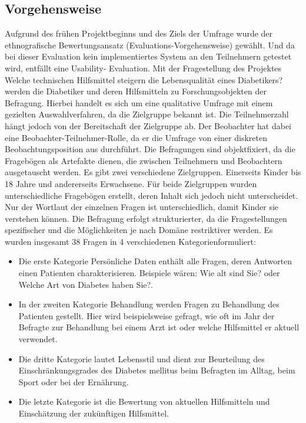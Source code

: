 \documentclass[a4paper,11pt]{article}%
\renewcommand{\\}{\vspace*{0.5\baselineskip} \newline}
\begin{document}
	\subsection{Vorgehensweise}
	Aufgrund des frühen Projektbeginns und des Ziels der Umfrage wurde der ethnografische Bewertungsansatz (Evaluations-Vorgehensweise) gewählt. Und da bei dieser Evaluation kein implementiertes System an den Teilnehmern getestet wird, entfällt eine Usability- Evaluation. Mit der Fragestellung des Projektes \glqq Welche technischen Hilfsmittel steigern die Lebensqualität eines Diabetikers?\grqq{} werden die Diabetiker und deren Hilfsmitteln zu Forschungsobjekten der Befragung. Hierbei handelt es sich um eine qualitative Umfrage mit einem gezielten Auswahlverfahren, da die Zielgruppe bekannt ist. Die Teilnehmerzahl hängt jedoch von der Bereitschaft der Zielgruppe ab. Der Beobachter hat dabei eine Beobachter-Teilnehmer-Rolle, da er die Umfrage von einer diskreten Beobachtungsposition aus durchführt. Die Befragungen sind objektfixiert, da die Fragebögen als Artefakte dienen, die zwischen Teilnehmern und Beobachtern ausgetauscht werden.\newline
	 Es gibt zwei verschiedene Zielgruppen. Einerseits Kinder bis 18 Jahre und andererseits Erwachsene. Für beide Zielgruppen wurden unterschiedliche Fragebögen erstellt, deren Inhalt sich jedoch nicht unterscheidet. Nur der Wortlaut der einzelnen Fragen ist unterschiedlich, damit Kinder sie verstehen können.\newline
	Die Befragung erfolgt strukturierter, da die Fragestellungen spezifischer und die Möglichkeiten je nach Domäne restriktiver werden. Es wurden insgesamt 38 Fragen in 4 verschiedenen Kategorienformuliert:\newline
	\begin{itemize}
		\item Die erste Kategorie \glqq Persönliche Daten\grqq{} enthält alle Fragen, deren Antworten einen Patienten charakterisieren. Beispiele wären: \glqq Wie alt sind Sie?\grqq{} oder \glqq Welche Art von Diabetes haben Sie?\grqq{}. 
		\item In der zweiten Kategorie \glqq Behandlung\grqq{} werden Fragen zu Behandlung des Patienten gestellt. Hier wird beispielsweise gefragt, wie oft im Jahr der Befragte zur Behandlung bei einem Arzt ist oder welche Hilfsmittel er aktuell verwendet. 
		\item Die dritte Kategorie lautet \glqq Lebensstil\grqq{} und dient zur Beurteilung des Einschränkungsgrades des Diabetes mellitus beim Befragten im Alltag, beim Sport oder bei der Ernährung. 
		\item Die letzte Kategorie ist die \glqq Bewertung\grqq{} von aktuellen Hilfsmitteln und Einschätzung der zukünftigen Hilfsmittel.
	\end{itemize}
\end{document}
